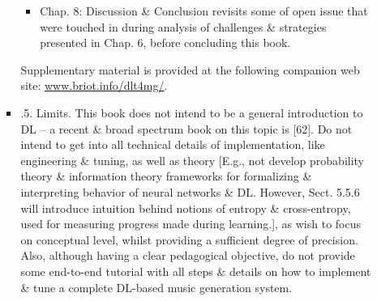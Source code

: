 \documentclass{article}
\begin{document}
\begin{itemize}
\begin{itemize}
\begin{itemize}
\begin{itemize}
				\item {\sf Chap. 8: Discussion \& Conclusion} revisits some of open issue that were touched in during analysis of challenges \& strategies presented in Chap. 6, before concluding this book.
			\end{itemize}
			Supplementary material is provided at the following companion web site: \url{www.briot.info/dlt4mg/}.
			\item {.5. Limits.} This book does not intend to be a general introduction to DL -- a recent \& broad spectrum book on this topic is [62]. Do not intend to get into all technical details of implementation, like engineering \& tuning, as well as theory [E.g., not develop probability theory \& information theory frameworks for formalizing \& interpreting behavior of neural networks \& DL. However, Sect. 5.5.6 will introduce intuition behind notions of entropy \& cross-entropy, used for measuring progress made during learning.], as wish to focus on conceptual level, whilst providing a sufficient degree of precision. Also, although having a clear pedagogical objective, do not provide some end-to-end tutorial with all steps \& details on how to implement \& tune a complete DL-based music generation system.
			

\end{itemize}
\end{itemize}
\end{itemize}
\end{document}
